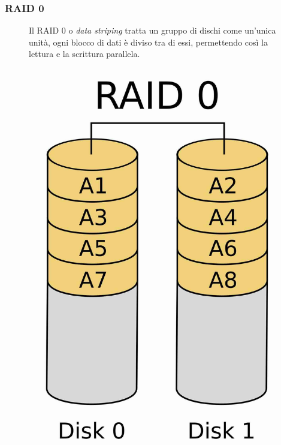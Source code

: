 \subsubsection*{RAID 0}
\begin{figure}[H]
    \centering
    \begin{minipage}{0.8\textwidth}
        Il RAID 0 o \textit{data striping} tratta un gruppo di dischi come un'unica unità, ogni blocco di dati è diviso tra di essi, permettendo così la lettura e la scrittura parallela.
    \end{minipage}
    \hfill
    \begin{minipage}{0.15\textwidth}
        \centering
        \includegraphics[width=1\linewidth]{assets/RAID_0.jpeg}
    \end{minipage}
\end{figure}


